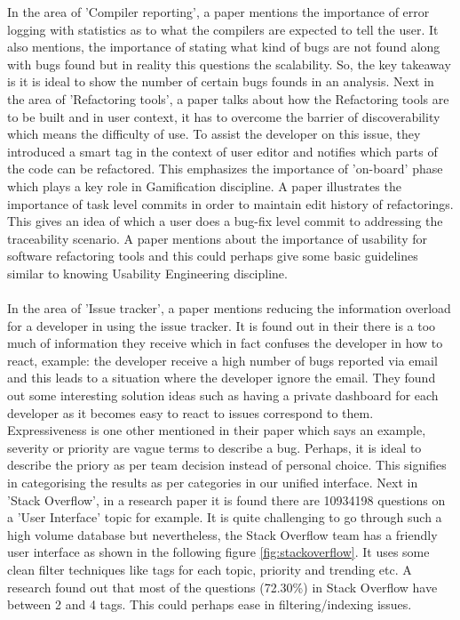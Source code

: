 In the area of 'Compiler reporting', a paper \cite{horning} mentions the importance of error logging with statistics as to what the compilers are expected to tell the user. It also mentions, the importance of stating what kind of bugs are not found along with bugs found but in reality this questions the scalability. So, the key takeaway is it is ideal to show the number of certain bugs founds in an analysis. Next in the area of 'Refactoring tools', a paper  \cite{dustinca} talks about how the Refactoring tools are to be built and in user context, it has to overcome the barrier of discoverability which means the difficulty of use. To assist the developer on this issue, they introduced a smart tag in the context of user editor and notifies which parts of the code can be refactored. This emphasizes the importance of 'on-board' phase which plays a key role in Gamification \cite{gamify} discipline. A paper \cite{Hayashi} illustrates the importance of task level commits in order to maintain edit history of refactorings. This gives an idea of which a user does a bug-fix level commit to addressing the traceability scenario. A paper  \cite{Mealy} mentions about the importance of usability for software refactoring tools and this could perhaps give some basic guidelines similar to knowing Usability Engineering \cite{usability} discipline. \\ \\

In the area of 'Issue tracker', a paper \cite{Baysal} mentions reducing the information overload for a developer in using the issue tracker. It is found out in their there is a too much of information they receive which in fact confuses the developer in how to react, example: the developer receive a high number of bugs reported via email and this leads to a situation where the developer ignore the email. They found out some interesting solution ideas such as having a private dashboard for each developer as it becomes easy to react to issues correspond to them. Expressiveness is one other mentioned in their paper which says an example, severity or priority are vague terms to describe a bug. Perhaps, it is ideal to describe the priory as per team decision instead of personal choice.  This signifies in categorising the results as per categories in our unified interface. Next in 'Stack Overflow', in a research paper \cite{stack} it is found there are 10934198 questions on a 'User Interface' topic for example. It is quite challenging to go through such a high volume database but nevertheless, the Stack Overflow team has a friendly user interface as shown in the following figure \ref{fig:stackoverflow}. It uses some clean filter techniques like tags for each topic, priority and trending etc. A research \cite{Treude.2011} found out that most of the questions (72.30\%) in Stack Overflow have between 2 and 4 tags. This could perhaps ease in filtering/indexing issues. \\ \\

